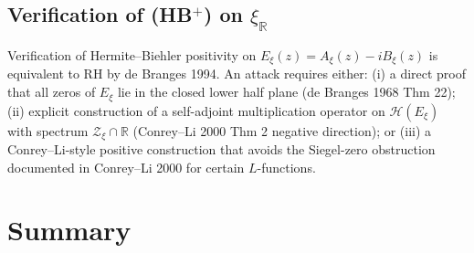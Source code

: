 \subsection{Verification of (HB\(^{+}\)) on \(\xi_{\mathbb{R}}\)}
\label{v4-arith:w5-synth:HB-verification}

Verification of Hermite--Biehler positivity on
\(E_{\xi}(z)=A_{\xi}(z)-iB_{\xi}(z)\) is equivalent to RH by
de Branges 1994. An attack requires either: (i) a direct proof that
all zeros of \(E_{\xi}\) lie in the closed lower half plane
(de Branges 1968 Thm 22); (ii) explicit construction of a
self-adjoint multiplication operator on \(\mathcal{H}(E_{\xi})\)
with spectrum \(\mathcal{Z}_{\xi}\cap\mathbb{R}\) (Conrey--Li 2000 Thm
2 negative direction); or (iii) a Conrey--Li-style positive
construction that avoids the Siegel-zero obstruction documented in
Conrey--Li 2000 for certain \(L\)-functions.

\section{Summary}
\label{v4-arith:w5-synth:summary}

